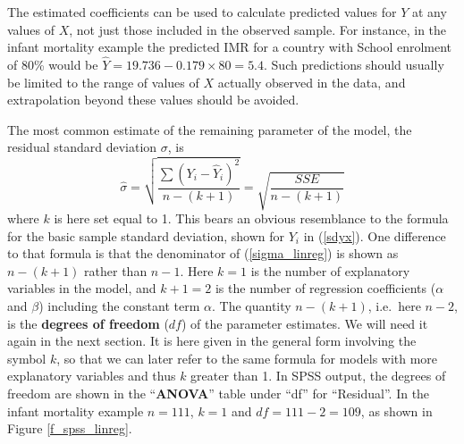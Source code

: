 The estimated coefficients can be used to calculate predicted values for
$Y$ at any values of $X$, not just those included in the observed
sample. For instance, in the infant mortality example the predicted IMR
for a country with School enrolment of 80\% would be
$\hat{Y}=19.736-0.179\times 80=5.4$. Such predictions should usually be
limited to the range of values of $X$ actually observed in the data, and
extrapolation beyond these values should be avoided.

The most common estimate of the remaining parameter of the model, the
residual standard deviation $\sigma$, is
\begin{equation}
\hat{\sigma}=
\sqrt{
\frac{\sum (Y_{i}-\hat{Y}_{i})^{2}}{n-(k+1)}
}
=\sqrt{
\frac{SSE}{n-(k+1)}
}
\label{sigma_linreg}
\end{equation}
where $k$ is here set equal to 1. This bears an obvious resemblance to the
formula for the basic sample standard deviation, shown for $Y_{i}$ in
(\ref{sdyx}). One difference to that formula is that the denominator of
(\ref{sigma_linreg}) is shown as $n-(k+1)$ rather than $n-1$. Here $k=1$
is the number of explanatory variables in the model, and $k+1=2$ is the
number of regression coefficients ($\alpha$ and $\beta$) including the
constant term $\alpha$. The quantity $n-(k+1)$, i.e.\ here $n-2$, is the
\textbf{degrees of freedom} ($df$) of the parameter estimates. We
will need it again in the next section. It is here given in the general
form involving the symbol $k$, so that we can later refer to the same
formula for models with more explanatory variables and thus $k$ greater
than 1. In SPSS output, the degrees of freedom are shown in the
``\textbf{ANOVA}'' table under ``df'' for ``Residual''. In the infant
mortality example
$n=111$, $k=1$ and $df=111-2=109$, as shown in Figure
\ref{f_spss_linreg}.

